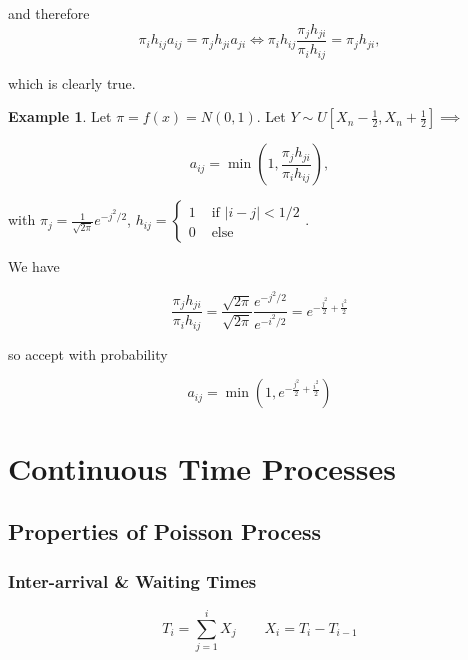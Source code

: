 \documentclass{article}
\theoremstyle{definition}
\newtheorem{exmp}{Example}[section]
\begin{document}
and therefore
$$
\pi_i h_{ij} a_{ij} = \pi_j h_{ji} a_{ji} \iff \pi_i h_{ij} \frac{\pi_j h_{ji}}{\pi_i h_{ij}} = \pi_j h_{ji},
$$

which is clearly true.

\begin{exmp}
Let $\pi = f(x) = N(0,1)$. Let $Y \sim U \left[ X_n - \frac{1}{2}, X_n + \frac{1}{2} \right]  \implies$

$$
a_{ij} = \min \left( 1, \frac{\pi_j h_{ji}}{\pi_i h_{ij}} \right),
$$

with $\pi_j = \frac{1}{\sqrt{2\pi}} e^{-j^2/2}$,
$h_{ij} = \begin{cases}
    1 & \text{ if } | i - j | < 1/2 \\
    0 & \text{ else}
\end{cases}$.

We have

$$
\frac{\pi_j h_{ji}}{\pi_i h_{ij}} = \frac{\sqrt{2\pi}}{\sqrt{2\pi}} \frac{e^{-j^2/2}}{e^{-i^2/2}} = e^{-\frac{j^2}{2} + \frac{i^2}{2}}
$$

so accept with probability

$$
a_{ij} = \min \left( 1, e^{-\frac{j^2}{2} + \frac{i^2}{2}} \right)
$$

\end{exmp}

\section{Continuous Time Processes}

\subsection{Properties of Poisson Process}

\subsubsection{Inter-arrival \& Waiting Times}

$$
T_i = \sum_{j=1}^i X_j \qquad X_i = T_i - T_{i-1}
$$
\end{document}
